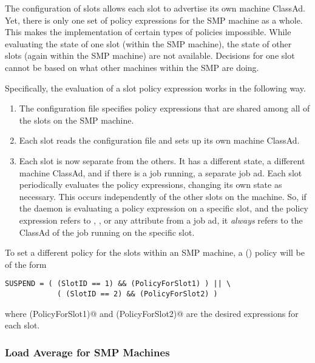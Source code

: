 The configuration of slots allows each slot to advertise
its own machine ClassAd.
Yet, there is only one set of policy expressions for the SMP
machine as a whole.
This makes the implementation of certain types of policies impossible.
While evaluating the state of one slot (within the SMP machine),
the state of other slots (again within the SMP machine) are not
available.
Decisions for one slot cannot be based on what other machines within the SMP
are doing.

Specifically, the evaluation of a slot policy expression works in
the following way.
\begin{enumerate}
\item 
The configuration file specifies policy expressions that are shared among
all of the slots on the SMP machine.
\item 
Each slot reads the configuration file and sets up its own machine ClassAd.
\item 
Each slot is now separate from the others.  It has a
different state, a different machine ClassAd, and if there is a job
running, a separate job ad.
Each slot periodically
evaluates the policy expressions, changing its own state
as necessary.
This occurs independently of the other slots on the machine.
So, if the  daemon is evaluating a policy expression
on a specific slot,
and the policy expression refers to , ,
or any attribute from a job ad,
it \emph{always} refers to the ClassAd of the
job running on the specific slot.
\end{enumerate}

To set a different policy for the slots within an SMP machine,
a (\verb@SUSPEND@) policy will be of the form
\begin{verbatim}
SUSPEND = ( (SlotID == 1) && (PolicyForSlot1) ) || \
            ( (SlotID == 2) && (PolicyForSlot2) )
\end{verbatim}
where \verb@(PolicyForSlot1)@ and \verb@(PolicyForSlot2)@ are the
desired expressions for each slot.

\subsubsection{\label{sec:SMP-Load}
Load Average for SMP Machines}

